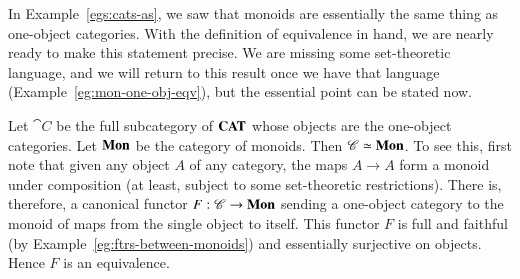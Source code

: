 \begin{example}
\label{eg:equivs-mon}
In Example~\ref{egs:cats-as}, we saw that monoids
are essentially the same thing as one-object%
%
%
categories.  With the definition of equivalence in hand, we are nearly
ready to make this statement precise.  We are missing some set-theoretic
language, and we will return to this result once we have that language
(Example~\ref{eg:mon-one-obj-eqv}), but the essential point can be stated
now.

Let $\cat{C}$ be the full subcategory of $\mathbf{CAT}$ whose objects are the
one-object categories.  Let $\mathbf{Mon}$ be the category of monoids.  Then
$\mathscr{C} \simeq \mathbf{Mon}$.  To see this, first note that given any object $A$ of
any category, the maps $A \to A$ form a monoid under composition (at least,
subject to some set-theoretic restrictions).  There is, therefore, a
canonical functor $F: \mathscr{C} \to \mathbf{Mon}$ sending a one-object category to
the monoid of maps from the single object to itself.  This functor $F$ is
full and faithful (by Example~\ref{eg:ftrs-between-monoids}) and
essentially surjective on objects.  Hence $F$ is an equivalence.
\end{example}

